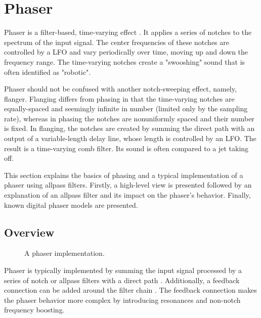 
\section{Phaser}
\label{chap:phaser}
Phaser is a filter-based, time-varying effect \cite{Zoelzer2011}. It applies a series of notches to the spectrum of the input signal. The center frequencies of these notches are controlled by a \ac{LFO} and vary periodically over time, moving up and down the frequency range. The time-varying notches create a "swooshing" sound that is often identified as "robotic".

Phaser should not be confused with another notch-sweeping effect, namely, flanger. Flanging differs from phasing in that the time-varying notches are equally-spaced and seemingly infinite in number (limited only by the sampling rate), whereas in phasing the notches are nonuniformly spaced and their number is fixed. In flanging, the notches are created by summing the direct path with an output of a variable-length delay line, whose length is controlled by an \ac{LFO}. The result is a time-varying comb filter. Its sound is often compared to a jet taking off.

This section explains the basics of phasing and a typical implementation of a phaser using allpass filters. Firstly, a high-level view is presented followed by an explanation of an allpass filter and its impact on the phaser's behavior. Finally, known digital phaser models are presented.

\subsection{Overview}
\label{sec:phaser_overview}

\begin{figure}
    \centering
    \vspace{2mm}
    
    \caption{A phaser implementation.}
    \label{fig:phaser}
\end{figure}

Phaser is typically implemented by summing the input signal processed by a series of notch or allpass filters with a direct path \cite{Zoelzer2011}. Additionally, a feedback connection can be added around the filter chain \cite{Kiiski2016}. The feedback connection makes the phaser behavior more complex by introducing resonances and non-notch frequency boosting.

